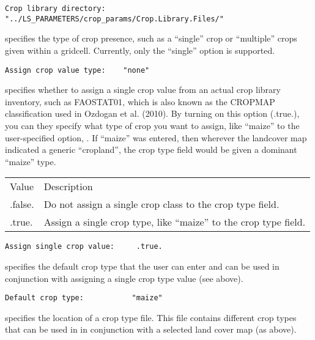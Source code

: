  \begin{Verbatim}[frame=single]
Crop library directory:  "../LS_PARAMETERS/crop_params/Crop.Library.Files/"
 \end{Verbatim}

  specifies the type of crop presence,
 such as a ``single'' crop or ``multiple'' crops given within a 
 gridcell.  Currently, only the ``single'' option is supported.

 \begin{Verbatim}[frame=single]
Assign crop value type:    "none"
 \end{Verbatim}

 
  specifies whether to assign a single
  crop value from an actual crop library inventory, such as FAOSTAT01,
  which is also known as the CROPMAP classification used in Ozdogan et al. (2010).
  By turning on this option (.true.), you can they specify what type of
  crop you want to assign, like ``maize'' to the user-specified option,
  .  If ``maize'' was entered, then wherever the landcover
  map indicated a generic ``cropland'', the crop type field would be given a
  dominant ``maize'' type.

 \begin{tabular}{ll}
 Value     & Description                                           \\
  .false.  &  Do not assign a single crop class to the crop type field. \\
  .true.   &  Assign a single crop type, like ``maize'' to the crop type field. \\
 \end{tabular}
 

 \begin{Verbatim}[frame=single]
Assign single crop value:     .true.    
 \end{Verbatim}

 
  specifies the default crop type that the
  user can enter and can be used in conjunction with assigning a single
  crop type value (see above).
 

 \begin{Verbatim}[frame=single]
Default crop type:           "maize"   
 \end{Verbatim}

 
  specifies the location of a crop type file.
 This file contains different crop types that can be used in 
 in conjunction with a selected land cover map (as above).
 

